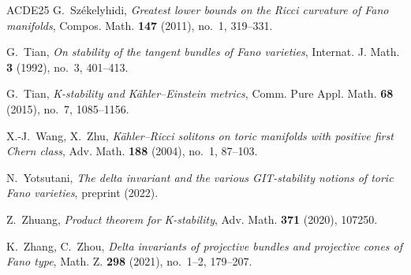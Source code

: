 \documentclass[11pt]{amsart}
\theoremstyle{definition}
\theoremstyle{remark}
\begin{document}
\begin{thebibliography}{ACDE25}
G.~Sz\'ekelyhidi,
\emph{Greatest lower bounds on the Ricci curvature of Fano manifolds},
Compos. Math. \textbf{147} (2011), no.~1, 319--331.

G.~Tian,
\emph{On stability of the tangent bundles of Fano varieties},
Internat. J. Math. \textbf{3} (1992), no.~3, 401--413.

G.~Tian,
\emph{K-stability and K\"ahler--Einstein metrics},
Comm. Pure Appl. Math. \textbf{68} (2015), no.~7, 1085--1156.

X.-J.~Wang, X.~Zhu,
\emph{K\"ahler--Ricci solitons on toric manifolds with positive first
Chern class},
Adv. Math. \textbf{188} (2004), no.~1, 87--103.

N.~Yotsutani,
\emph{The delta invariant and the various GIT-stability notions of
toric Fano varieties}, preprint (2022).

Z.~Zhuang,
\emph{Product theorem for K-stability},
Adv. Math. \textbf{371} (2020), 107250.

K.~Zhang, C.~Zhou,
\emph{Delta invariants of projective bundles and projective cones of
Fano type},
Math. Z. \textbf{298} (2021), no.~1--2, 179--207.

\end{thebibliography}
\end{document}
